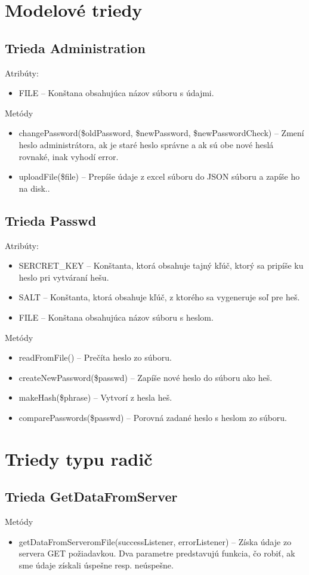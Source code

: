\documentclass[12pt,a4paper]{report}
\begin{document}
\section[Modelové triedy]{\rmfamily\bfseries
	Modelové triedy}

\subsection[Trieda Administration]{\rmfamily\bfseries
	Trieda Administration}
Atribúty:
\begin{itemize}
		\item FILE – Konštana obsahujúca názov súboru s údajmi. 
\end{itemize}
Metódy
\begin{itemize}
	\item changePassword(\$oldPassword, \$newPassword, \$newPasswordCheck) – Zmení heslo administrátora, ak je staré heslo správne a ak sú obe nové heslá rovnaké, inak vyhodí error.
	\item uploadFile(\$file) – Prepíše údaje z excel súboru do JSON súboru a zapíše ho na disk..
\end{itemize}

\subsection[Trieda Passwd]{\rmfamily\bfseries
	Trieda Passwd}
Atribúty:
\begin{itemize}
	\item SERCRET\_KEY – Konštanta, ktorá obsahuje tajný kľúč, ktorý sa pripíše ku heslo pri vytváraní hešu. 
	\item SALT – Konštanta, ktorá obsahuje kľúč, z ktorého sa vygeneruje soľ pre heš.
	\item FILE – Konštana obsahujúca názov súboru s heslom.
\end{itemize}
Metódy
\begin{itemize}
	\item readFromFile() – Prečíta heslo zo súboru.
	\item createNewPassword(\$passwd) – Zapíše nové heslo do súboru ako heš.
	\item makeHash(\$phrase) – Vytvorí z hesla heš.
	\item comparePasswords(\$passwd) – Porovná zadané heslo s heslom zo súboru.
\end{itemize}

\section[Triedy typu radič]{\rmfamily\bfseries
	Triedy typu radič}

\subsection[Trieda GetDataFromServer]{\rmfamily\bfseries
	Trieda GetDataFromServer}
Metódy
\begin{itemize}
	\item getDataFromServeromFile(successListener, errorListener) – Získa údaje zo servera GET požiadavkou. Dva parametre predstavujú funkcia, čo robiť, ak sme údaje získali úspešne resp. neúspešne.
\end{itemize}
\end{document}
